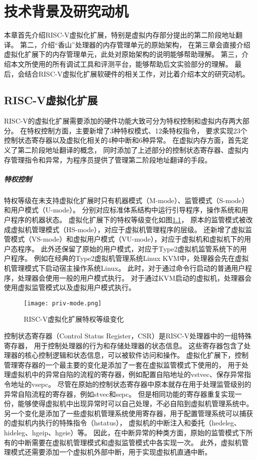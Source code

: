 \chapter{技术背景及研究动机}

本章首先介绍RISC-V虚拟化扩展，特别是虚拟内存部分提出的第二阶段地址翻译。
第二，介绍“香山”处理器的内存管理单元的原始架构，
在第三章会直接介绍虚拟化扩展下的内存管理单元，此处对原始架构的说明能够帮助理解。
第三，介绍本文所使用的所有调试工具和评测平台，能够帮助后文实验部分的理解。
最后，会结合RISC-V虚拟化扩展软硬件的相关工作，对比着介绍本文的研究动机。

\section{RISC-V虚拟化扩展}
RISC-V的虚拟化扩展需要添加的硬件功能大致可分为特权控制和虚拟内存两大部分。
在特权控制方面，主要新增了3种特权模式、12条特权指令，
要求实现23个控制状态寄存器以及虚拟化相关的4种中断和6种异常。
在虚拟内存方面，首先定义了第二阶段地址翻译的概念，
同时添加了上述部分的控制状态寄存器、虚拟内存管理指令和异常，为程序员提供了管理第二阶段地址翻译的手段。

\paragraph{特权控制}
特权等级在未支持虚拟化扩展时只有机器模式（M-mode）、监管模式（S-mode）和用户模式（U-mode）。
分别对应标准体系结构中运行引导程序，操作系统和用户程序的机器状态。
虚拟化扩展下的特权等级变化如图\ref*{fig:priv-mode}，
原本的监管模式被改成虚拟机管理模式（HS-mode），对应于虚拟机管理程序的层级。
还新增了虚拟监管模式（VS-mode）和虚拟用户模式（VU-mode），对应于虚拟机和虚拟机下的用户态程序。
此外还保留了原始的用户模式，对应于Type2虚拟机监管系统下的用户程序。
例如在经典的Type2虚拟机管理系统Linux KVM中，处理器会先在虚拟机管理模式下启动宿主操作系统Linux。
此时，对于通过命令行启动的普通用户程序，处理器会使用一般的用户模式执行。
对于通过KVM启动的虚拟机，处理器会使用虚拟监管模式以及虚拟用户模式执行。

\begin{figure}[htbp]
    \centering
    \texttt{[image: priv-mode.png]}
    \caption{RISC-V虚拟化扩展特权等级变化}
    \label{fig:priv-mode}
\end{figure}

控制状态寄存器（Control Status Register，CSR）是RISC-V处理器中的一组特殊寄存器，
用于控制处理器的行为和存储处理器的状态信息。
这些寄存器包含了处理器的核心控制逻辑和状态信息，可以被软件访问和操作。
虚拟化扩展下，控制管理寄存器的一个最主要的变化是添加了一套在虚拟监管模式下使用的，
用于处理虚拟机中的异常自陷的流程的寄存器，例如配置自陷地址的vstvec、保存异常指令地址的vsepc。
尽管在原始的控制状态寄存器中原本就存在用于处理监管级别的异常自陷流程的寄存器，例如stvec和sepc。
但是相同功能的寄存器重复实现一份，能够使得虚拟机中出现异常时可以自己处理，不必自陷到虚拟机管理系统中。
另一个变化是添加了一些虚拟机管理系统使用寄存器，用于配置管理系统可以捕获的虚拟机内执行的特殊指令（hstatus），
虚拟机的中断注入和委托（hedeleg、hideleg、hgeip、hgeie）等。
因此，在中断异常的种类方面，原始的监管模式下所有的中断需要在虚拟机管理模式和虚拟监管模式中各实现一次。
此外，虚拟机管理模式还需要添加一个虚拟机外部中断，用于实现虚拟机直通中断。

